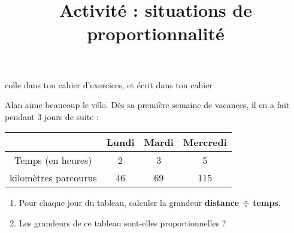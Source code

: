 \documentclass[a4paper,11pt]{article}
\title{Activité : situations de proportionnalité}
\date{}
\author{}
\makeatletter
\renewcommand{\maketitle}{%
{\scriptsize colle dans ton cahier d'exercices, et écrit dans ton cahier} \vspace{0.5em}

	\begin{center}
		\LARGE
		\uline{\@title}
		\vspace{2em}
	\end{center}
}
\makeatother
\begin{document}
\maketitle

\begin{exercice}
	Alan aime beaucoup le vélo. Dès sa première semaine de vacances, il en a fait pendant 3 jours de suite :

	\begin{tabular}{|c|c|c|c|}
		\hline
		                                           & \cellcolor{lightgray} Lundi & \cellcolor{lightgray} Mardi & \cellcolor{lightgray} Mercredi \\ \hline
		\cellcolor{lightgray} Temps (en heures)    & 2                           & 3                           & 5                              \\ \hline
		\cellcolor{lightgray} kilomètres parcourus & 46                          & 69                          & 115                            \\ \hline
	\end{tabular}
	\begin{enumerate}
		\item Pour chaque jour du tableau, calculer la grandeur \textbf{distance ÷ temps}.
		\item Les grandeurs de ce tableau sont-elles proportionnelles ?
	\end{enumerate}
\end{exercice}

\vspace{1.5em}
\end{document}
